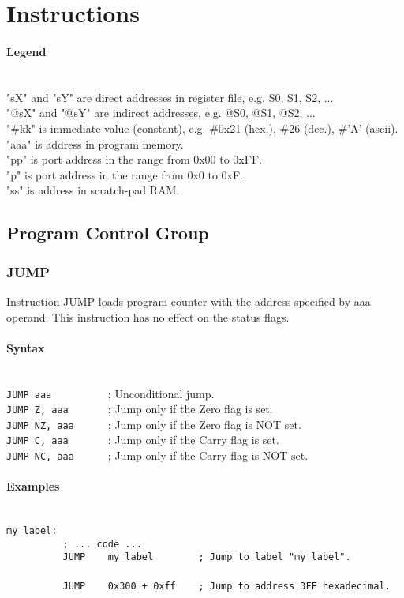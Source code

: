 \section{Instructions}
    \paragraph{Legend}
        ~\\
        "sX" and "sY" are direct addresses in register file, e.g. S0, S1, S2, ...\\
        "@sX" and "@sY" are indirect addresses, e.g. @S0, @S1, @S2, ...\\
        "\#kk" is immediate value (constant), e.g. \#0x21 (hex.), \#26 (dec.), \#'A' (ascii).\\
        "aaa" is address in program memory.\\
        "pp" is port address in the range from 0x00 to 0xFF.\\
        "p" is port address in the range from 0x0 to 0xF.\\
        "ss" is address in scratch-pad RAM.

    \subsection{Program Control Group}
        \subsubsection{JUMP}
            Instruction JUMP loads program counter with the address specified by aaa operand. This instruction has no effect on the status flags.

            \paragraph{Syntax}
                ~\\
                \verb'JUMP aaa          '; Unconditional jump.\\
                \verb'JUMP Z, aaa       '; Jump only if the Zero flag is set.\\
                \verb'JUMP NZ, aaa      '; Jump only if the Zero flag is NOT set.\\
                \verb'JUMP C, aaa       '; Jump only if the Carry flag is set.\\
                \verb'JUMP NC, aaa      '; Jump only if the Carry flag is NOT set.

            \paragraph{Examples}
                ~\\
                \verb'my_label:'\\
                \verb'          ; ... code ...'\\
                \verb'          JUMP    my_label        ; Jump to label "my_label".'\\
                \verb''\\
                \verb'          JUMP    0x300 + 0xff    ; Jump to address 3FF hexadecimal.'

